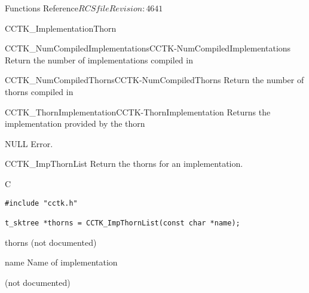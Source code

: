 \begin{cactuspart}{ Functions Reference}{$RCSfile$}{$Revision: 4641 $}
\begin{FunctionDescription}{CCTK\_ImplementationThorn}
\begin{SeeAlsoSection}
\begin{SeeAlso2}{CCTK\_NumCompiledImplementations}{CCTK-NumCompiledImplementations}
  Return the number of implementations compiled in
\end{SeeAlso2}
\begin{SeeAlso2}{CCTK\_NumCompiledThorns}{CCTK-NumCompiledThorns}
  Return the number of thorns compiled in
\end{SeeAlso2}
\begin{SeeAlso2}{CCTK\_ThornImplementation}{CCTK-ThornImplementation}
  Returns the implementation provided by the thorn
\end{SeeAlso2}
\end{SeeAlsoSection}

\begin{ErrorSection}
\begin{Error}{NULL}
Error.
\end{Error}
\end{ErrorSection}

\end{FunctionDescription}



\begin{FunctionDescription}{CCTK\_ImpThornList}
\label{CCTK-ImpThornList}
Return the thorns for an implementation.

\begin{SynopsisSection}
\begin{Synopsis}{C}
\begin{verbatim}
#include "cctk.h"

t_sktree *thorns = CCTK_ImpThornList(const char *name);
\end{verbatim}
\end{Synopsis}
\end{SynopsisSection}

\begin{ResultSection}
\begin{Result}{thorns}
(not documented)
\end{Result}
\end{ResultSection}

\begin{ParameterSection}
\begin{Parameter}{name}
Name of implementation
\end{Parameter}
\end{ParameterSection}

\begin{Discussion}
(not documented)
\end{Discussion}


\end{FunctionDescription}
\end{cactuspart}
